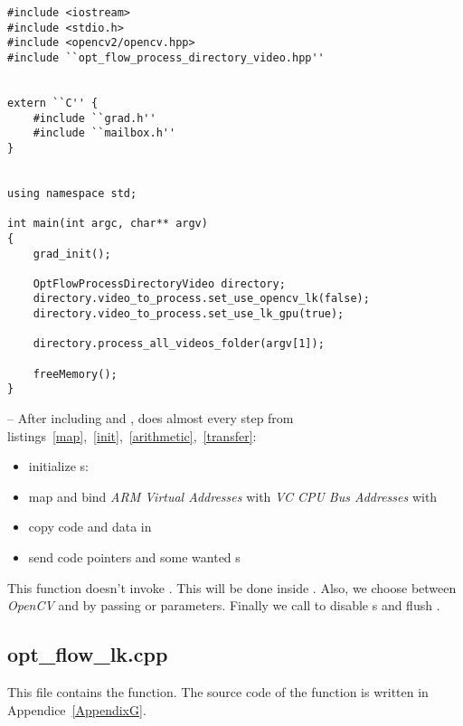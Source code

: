 \begin{lstlisting}
#include <iostream>
#include <stdio.h>
#include <opencv2/opencv.hpp>
#include ``opt_flow_process_directory_video.hpp''


extern ``C'' {
	#include ``grad.h''
	#include ``mailbox.h''
}


using namespace std;

int main(int argc, char** argv)
{
	grad_init();

	OptFlowProcessDirectoryVideo directory;
	directory.video_to_process.set_use_opencv_lk(false);
	directory.video_to_process.set_use_lk_gpu(true);

	directory.process_all_videos_folder(argv[1]);

	freeMemory();
}
\end{lstlisting}

-- After including  and ,  does almost every step from listings~\ref{map},~\ref{init},~\ref{arithmetic},~\ref{transfer}:
\begin{itemize}
	\item initialize \qpu{}s: 
	\item map \ram{} and bind \emph{ARM Virtual Addresses} with \emph{VC CPU Bus Addresses} with 
	\item copy code and data in \ram
	\item send code pointers and some wanted \uni{}s
\end{itemize}

This function doesn't invoke . This will be done inside . Also, we choose between \emph{OpenCV} and  by passing  or  parameters. Finally we call  to disable \qpu{}s and flush \ram.


\subsection{opt\_flow\_lk.cpp}

This file contains the  function. The source code of the function is written in Appendice~\ref{AppendixG}.

